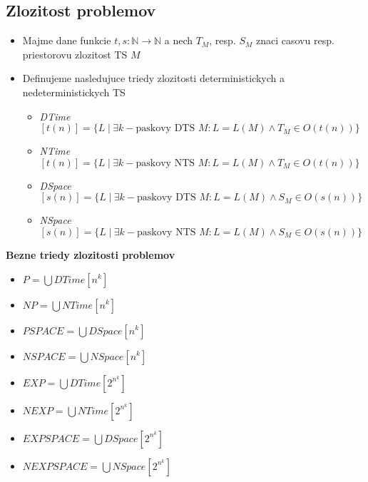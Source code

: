 \documentclass[12pt]{article}
\newcommand{\pipesep}{\hspace{3pt} \vert \hspace{3pt}}
\begin{document}
\subsection*{Zlozitost problemov}
\begin{itemize}
	\item Majme dane funkcie $t,s: \mathbb{N} \to \mathbb{N}$ a nech $T_{M}$, resp. $S_{M}$ znaci casovu resp. priestorovu zlozitost TS $M$
	\item Definujeme nasledujuce triedy zlozitosti deterministickych a nedeterministickych TS
		\begin{itemize}
			\item \emph{DTime}$[t(n)] = \{L \pipesep \exists k-\text{paskovy DTS }M: L = L(M) \land T_{M} \in O(t(n))\}$
			\item \emph{NTime}$[t(n)] = \{L \pipesep \exists k-\text{paskovy NTS }M: L = L(M) \land T_{M} \in O(t(n))\}$
			\item \emph{DSpace}$[s(n)] = \{L \pipesep \exists k-\text{paskovy DTS }M: L = L(M) \land S_{M} \in O(s(n))\}$
			\item \emph{NSpace}$[s(n)] = \{L \pipesep \exists k-\text{paskovy NTS }M: L = L(M) \land S_{M} \in O(s(n))\}$
		\end{itemize}
\end{itemize}
\textbf{Bezne triedy zlozitosti problemov}\\
\begin{itemize}
	\item $P = \bigcup DTime[n^{k}]$
	\item $NP = \bigcup NTime[n^{k}]$
	\item $PSPACE = \bigcup DSpace[n^{k}]$
	\item $NSPACE = \bigcup NSpace[n^{k}]$
	\item $EXP = \bigcup DTime[2^{n^{k}}]$
	\item $NEXP = \bigcup NTime[2^{n^{k}}]$
	\item $EXPSPACE = \bigcup DSpace[2^{n^{k}}]$
	\item $NEXPSPACE = \bigcup NSpace[2^{n^{k}}]$
\end{itemize}
\end{document}
